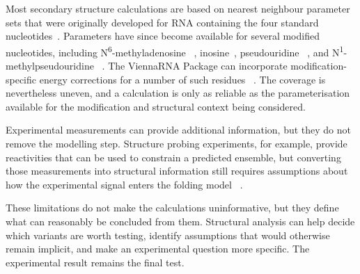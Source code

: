 Most secondary structure calculations are based on nearest neighbour parameter
sets that were originally developed for RNA containing the four standard
nucleotides~\cite{nndb2024}. Parameters have since become available for several
modified nucleotides, including N\textsuperscript{6}-methyladenosine
~\cite{szabat2022}, inosine~\cite{wright2007}, pseudouridine
~\cite{shabangu2026psi}, and N\textsuperscript{1}-methylpseudouridine
~\cite{kierzek2026m1psi}. The ViennaRNA Package can incorporate
modification-specific energy corrections for a number of such residues
~\cite{varenyk2023}. The coverage is nevertheless uneven, and a calculation is
only as reliable as the parameterisation available for the modification and
structural context being considered.

Experimental measurements can provide additional information, but they do not
remove the modelling step. Structure probing experiments, for example, provide
reactivities that can be used to constrain a predicted ensemble, but converting
those measurements into structural information still requires assumptions about
how the experimental signal enters the folding model
~\cite{deigan2009,lorenz2016}.

These limitations do not make the calculations uninformative, but they define
what can reasonably be concluded from them. Structural analysis can help decide
which variants are worth testing, identify assumptions that would otherwise
remain implicit, and make an experimental question more specific. The
experimental result remains the final test.
